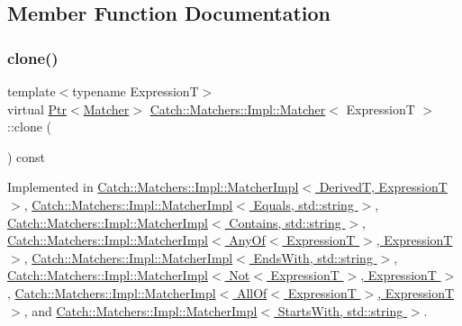 \subsection{Member Function Documentation}
\hypertarget{struct_catch_1_1_matchers_1_1_impl_1_1_matcher_a9d31e5018fea24efa08c3cbf5aa4475d}{}\label{struct_catch_1_1_matchers_1_1_impl_1_1_matcher_a9d31e5018fea24efa08c3cbf5aa4475d} 
\subsubsection{\texorpdfstring{clone()}{clone()}}
{\footnotesize\ttfamily template$<$typename ExpressionT$>$ \\
virtual \hyperlink{class_catch_1_1_ptr}{Ptr}$<$\hyperlink{struct_catch_1_1_matchers_1_1_impl_1_1_matcher}{Matcher}$>$ \hyperlink{struct_catch_1_1_matchers_1_1_impl_1_1_matcher}{Catch\+::\+Matchers\+::\+Impl\+::\+Matcher}$<$ ExpressionT $>$\+::clone (\begin{DoxyParamCaption}{ }\end{DoxyParamCaption}) const\hspace{0.3cm}{\ttfamily [pure virtual]}}



Implemented in \hyperlink{struct_catch_1_1_matchers_1_1_impl_1_1_matcher_impl_af7cf4b7b730145d4455dc356490e6b77}{Catch\+::\+Matchers\+::\+Impl\+::\+Matcher\+Impl$<$ Derived\+T, Expression\+T $>$}, \hyperlink{struct_catch_1_1_matchers_1_1_impl_1_1_matcher_impl_af7cf4b7b730145d4455dc356490e6b77}{Catch\+::\+Matchers\+::\+Impl\+::\+Matcher\+Impl$<$ Equals, std\+::string $>$}, \hyperlink{struct_catch_1_1_matchers_1_1_impl_1_1_matcher_impl_af7cf4b7b730145d4455dc356490e6b77}{Catch\+::\+Matchers\+::\+Impl\+::\+Matcher\+Impl$<$ Contains, std\+::string $>$}, \hyperlink{struct_catch_1_1_matchers_1_1_impl_1_1_matcher_impl_af7cf4b7b730145d4455dc356490e6b77}{Catch\+::\+Matchers\+::\+Impl\+::\+Matcher\+Impl$<$ Any\+Of$<$ Expression\+T $>$, Expression\+T $>$}, \hyperlink{struct_catch_1_1_matchers_1_1_impl_1_1_matcher_impl_af7cf4b7b730145d4455dc356490e6b77}{Catch\+::\+Matchers\+::\+Impl\+::\+Matcher\+Impl$<$ Ends\+With, std\+::string $>$}, \hyperlink{struct_catch_1_1_matchers_1_1_impl_1_1_matcher_impl_af7cf4b7b730145d4455dc356490e6b77}{Catch\+::\+Matchers\+::\+Impl\+::\+Matcher\+Impl$<$ Not$<$ Expression\+T $>$, Expression\+T $>$}, \hyperlink{struct_catch_1_1_matchers_1_1_impl_1_1_matcher_impl_af7cf4b7b730145d4455dc356490e6b77}{Catch\+::\+Matchers\+::\+Impl\+::\+Matcher\+Impl$<$ All\+Of$<$ Expression\+T $>$, Expression\+T $>$}, and \hyperlink{struct_catch_1_1_matchers_1_1_impl_1_1_matcher_impl_af7cf4b7b730145d4455dc356490e6b77}{Catch\+::\+Matchers\+::\+Impl\+::\+Matcher\+Impl$<$ Starts\+With, std\+::string $>$}.

